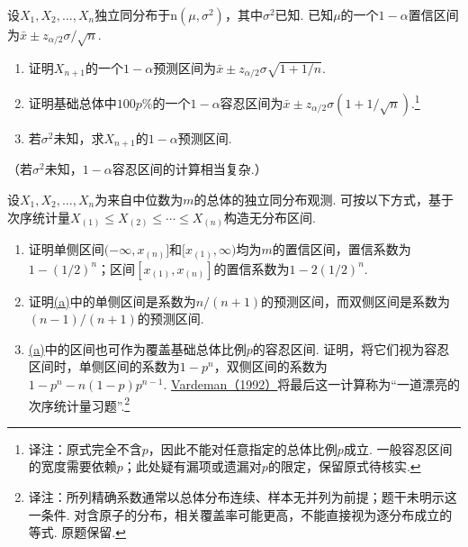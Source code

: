 \begin{exercise}\label{exercise:9.57}
设$X_1,X_2,\ldots,X_n$独立同分布于$\mathrm n(\mu,\sigma^2)$，其中$\sigma^2$已知. 已知$\mu$的一个$1-\alpha$置信区间为$\bar x\pm z_{\alpha/2}\sigma/\sqrt n$.
\begin{enumerate}
\item 证明$X_{n+1}$的一个$1-\alpha$预测区间为$\bar x\pm z_{\alpha/2}\sigma\sqrt{1+1/n}$.
\item 证明基础总体中$100p\%$的一个$1-\alpha$容忍区间为$\bar x\pm z_{\alpha/2}\sigma(1+1/\sqrt n)$.\footnote{译注：原式完全不含$p$，因此不能对任意指定的总体比例$p$成立. 一般容忍区间的宽度需要依赖$p$；此处疑有漏项或遗漏对$p$的限定，保留原式待核实.}
\item 若$\sigma^2$未知，求$X_{n+1}$的$1-\alpha$预测区间.
\end{enumerate}
（若$\sigma^2$未知，$1-\alpha$容忍区间的计算相当复杂.）
\end{exercise}
\begin{exercise}\label{exercise:9.58}
设$X_1,X_2,\ldots,X_n$为来自中位数为$m$的总体的独立同分布观测. 可按以下方式，基于次序统计量$X_{(1)}\le X_{(2)}\le\cdots\le X_{(n)}$构造无分布区间.
\begin{enumerate}
\item\label{item:9.58.a}证明单侧区间$(-\infty,x_{(n)}]$和$[x_{(1)},\infty)$均为$m$的置信区间，置信系数为$1-(1/2)^n$；区间$[x_{(1)},x_{(n)}]$的置信系数为$1-2(1/2)^n$.
\item 证明\hyperref[item:9.58.a]{(a)}中的单侧区间是系数为$n/(n+1)$的预测区间，而双侧区间是系数为$(n-1)/(n+1)$的预测区间.
\item \hyperref[item:9.58.a]{(a)}中的区间也可作为覆盖基础总体比例$p$的容忍区间. 证明，将它们视为容忍区间时，单侧区间的系数为$1-p^n$，双侧区间的系数为$1-p^n-n(1-p)p^{n-1}$. \hyperref[bib:source321]{Vardeman（1992）}将最后这一计算称为“一道漂亮的次序统计量习题”.\footnote{译注：所列精确系数通常以总体分布连续、样本无并列为前提；题干未明示这一条件. 对含原子的分布，相关覆盖率可能更高，不能直接视为逐分布成立的等式. 原题保留.}
\end{enumerate}

\end{exercise}
